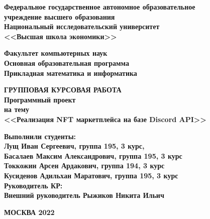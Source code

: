\begin{titlepage}
    \begin{center}
        {\bfseries Федеральное государственное автономное образовательное\\
        учреждение высшего образования\\}
        \vspace{0.5cm}
        {\bfseries Национальный исследовательский университет\\
        <<Высшая школа экономики>>\\}
        \vspace{1.5cm}

        {\bfseries Факультет компьютерных наук\\}
        \vspace{0.5cm}
        {\bfseries Основная образовательная программа\\
        Прикладная математика и информатика\\}

        \vspace{3cm}
        \textbf{ГРУППОВАЯ КУРСОВАЯ РАБОТА\\
        Программный проект\\
        на тему\\
        <<Реализация NFT маркетплейса на базе Discord API>>}


        \vspace{3cm}
    \end{center}
    \begin{flushleft}
      \textbf{Выполнили студенты:\\
      Лущ Иван Сергеевич, группа 195, 3 курс,\\
      Басалаев Максим Александрович, группа 195, 3 курс\\
      Токкожин Арсен Ардакович, группа 194, 3 курс\\
      Кусиденов Адильхан Маратович, группа 195, 3 курс
      }\\
      \vspace{1cm}
      \textbf{Руководитель КР:\\
      Внешний руководитель Рыжиков Никита Ильич}
  \end{flushleft}
  \begin{center}
      \textbf{МОСКВА 2022}
    \end{center}
  \end{titlepage}
